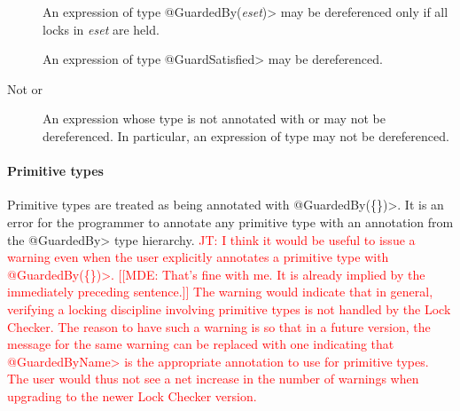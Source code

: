 \begin{description}

\item[]
  An expression of type \<@GuardedBy(\emph{eset})> may be dereferenced only
  if all locks in \emph{eset} are held.

\item[]
  An expression of type \<@GuardSatisfied> may be dereferenced.

\item[Not  or ]
  An expression whose type is not annotated with  or
   may not be dereferenced.
  In particular, an expression of type  may not be dereferenced.

\end{description}

\paragraph{Primitive types}

Primitive types are treated as being annotated with \<@GuardedBy(\{\})>.
It is an error for the programmer to annotate any primitive type with an annotation from
the \<@GuardedBy> type hierarchy.
\textcolor{red}{JT: I think it would be useful to issue a warning
even when the user explicitly annotates a primitive type with
\<@GuardedBy(\{\})>.
[[MDE: That's fine with me.  It is already implied by the immediately
preceding sentence.]]
The warning would indicate that in general, verifying a locking discipline
involving primitive types is not handled by the Lock Checker.
The reason to have such a warning is so that in a future version,
the message for the same warning can be replaced with one indicating that
\<@GuardedByName> is the appropriate annotation to use for primitive types.
The user would thus not see a net increase in the number of warnings when
upgrading to the newer Lock Checker version.}


